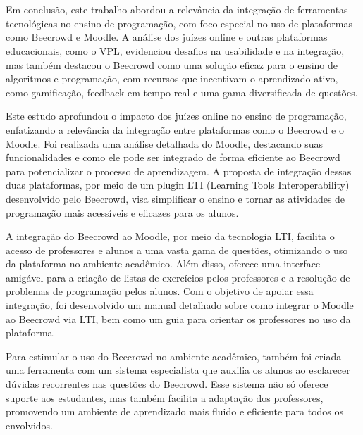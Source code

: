 

\chapter{}

Em conclusão, este trabalho abordou a relevância da integração de ferramentas tecnológicas no ensino de programação, com foco especial no uso de plataformas como Beecrowd e Moodle. A análise dos juízes online e outras plataformas educacionais, como o VPL, evidenciou desafios na usabilidade e na integração, mas também destacou o Beecrowd como uma solução eficaz para o ensino de algoritmos e programação, com recursos que incentivam o aprendizado ativo, como gamificação, feedback em tempo real e uma gama diversificada de questões.

Este estudo aprofundou o impacto dos juízes online no ensino de programação, enfatizando a relevância da integração entre plataformas como o Beecrowd e o Moodle. Foi realizada uma análise detalhada do Moodle, destacando suas funcionalidades e como ele pode ser integrado de forma eficiente ao Beecrowd para potencializar o processo de aprendizagem. A proposta de integração dessas duas plataformas, por meio de um plugin LTI (Learning Tools Interoperability) desenvolvido pelo Beecrowd, visa simplificar o ensino e tornar as atividades de programação mais acessíveis e eficazes para os alunos.

A integração do Beecrowd ao Moodle, por meio da tecnologia LTI, facilita o acesso de professores e alunos a uma vasta gama de questões, otimizando o uso da plataforma no ambiente acadêmico. Além disso, oferece uma interface amigável para a criação de listas de exercícios pelos professores e a resolução de problemas de programação pelos alunos. Com o objetivo de apoiar essa integração, foi desenvolvido um manual detalhado sobre como integrar o Moodle ao Beecrowd via LTI, bem como um guia para orientar os professores no uso da plataforma.

Para estimular o uso do Beecrowd no ambiente acadêmico, também foi criada uma ferramenta com um sistema especialista que auxilia os alunos ao esclarecer dúvidas recorrentes nas questões do Beecrowd. Esse sistema não só oferece suporte aos estudantes, mas também facilita a adaptação dos professores, promovendo um ambiente de aprendizado mais fluido e eficiente para todos os envolvidos.

